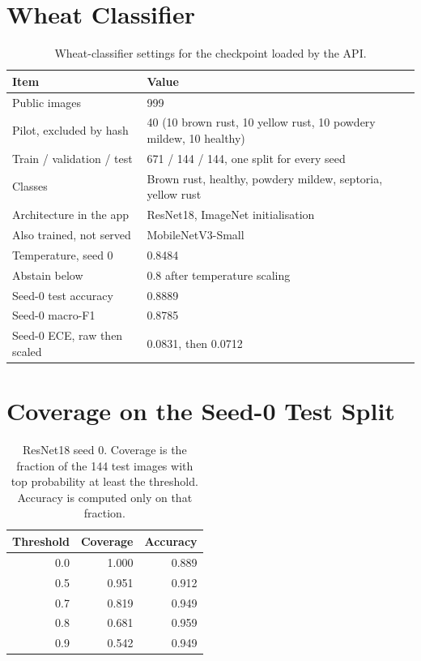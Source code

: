 \section{Wheat Classifier}
\begin{table}[H]
\centering
\caption{Wheat-classifier settings for the checkpoint loaded by the API.}
\label{tab:clf-settings}
\begin{tabular}{lp{}}
\toprule
\textbf{Item} & \textbf{Value} \\
\midrule
Public images & 999 \cite{long2023data} \\
Pilot, excluded by hash & 40 (10 brown rust, 10 yellow rust, 10 powdery mildew, 10 healthy) \\
Train / validation / test & 671 / 144 / 144, one split for every seed \\
Classes & Brown rust, healthy, powdery mildew, septoria, yellow rust \\
Architecture in the app & ResNet18, ImageNet initialisation \\
Also trained, not served & MobileNetV3-Small \\
Temperature, seed 0 & 0.8484 \\
Abstain below & 0.8 after temperature scaling \\
Seed-0 test accuracy & 0.8889 \\
Seed-0 macro-F1 & 0.8785 \\
Seed-0 ECE, raw then scaled & 0.0831, then 0.0712 \\
\bottomrule
\end{tabular}
\end{table}

\section{Coverage on the Seed-0 Test Split}
\begin{table}[H]
\centering
\caption{ResNet18 seed 0. Coverage is the fraction of the 144 test images with top probability at least the threshold. Accuracy is computed only on that fraction.}
\label{tab:coverage}
\begin{tabular}{rrr}
\toprule
\textbf{Threshold} & \textbf{Coverage} & \textbf{Accuracy} \\
\midrule
0.0 & 1.000 & 0.889 \\
0.5 & 0.951 & 0.912 \\
0.7 & 0.819 & 0.949 \\
0.8 & 0.681 & 0.959 \\
0.9 & 0.542 & 0.949 \\
\bottomrule
\end{tabular}
\end{table}

